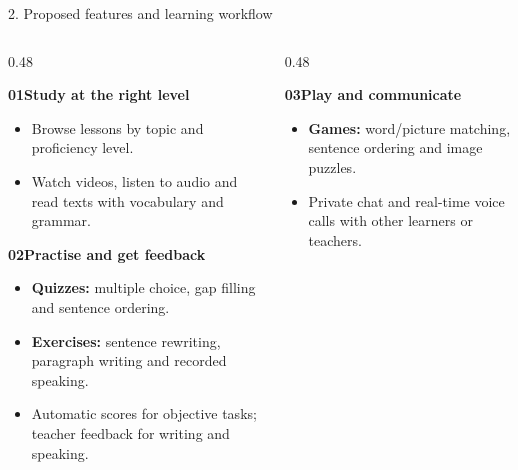 \documentclass[10pt,t,aspectratio=169]{beamer}
\newenvironment{topicblock}[1]{%
  \par\vspace{0.12cm}%
  {\normalsize\bfseries\color{hustprimary}#1}\par\vspace{-0.08cm}%
}{\par}
\begin{document}
\begin{frame}{2. Proposed features and learning workflow}

  \begin{columns}[T,onlytextwidth]
    \begin{column}{0.48\textwidth}
      \begin{topicblock}{01\quad Study at the right level}
        \small
        \begin{itemize}
          \setlength{\itemsep}{0.2em}
          \setlength{\parsep}{0pt}
          \item Browse lessons by topic and proficiency level.
          \item Watch videos, listen to audio and read texts with vocabulary and grammar.
        \end{itemize}
      \end{topicblock}
      \vspace{0.08cm}
      \begin{topicblock}{02\quad Practise and get feedback}
        \small
        \begin{itemize}
          \setlength{\itemsep}{0.2em}
          \setlength{\parsep}{0pt}
          \item \textbf{Quizzes:} multiple choice, gap filling and sentence ordering.
          \item \textbf{Exercises:} sentence rewriting, paragraph writing and recorded speaking.
          \item Automatic scores for objective tasks; teacher feedback for writing and speaking.
        \end{itemize}
      \end{topicblock}
    \end{column}
    \begin{column}{0.48\textwidth}
      \begin{topicblock}{03\quad Play and communicate}
        \small
        \begin{itemize}
          \setlength{\itemsep}{0.2em}
          \setlength{\parsep}{0pt}
          \item \textbf{Games:} word/picture matching, sentence ordering and image puzzles.
          \item Private chat and real-time voice calls with other learners or teachers.
        \end{itemize}
      \end{topicblock}
      \vspace{0.08cm}

\end{column}
\end{columns}
\end{frame}
\end{document}
